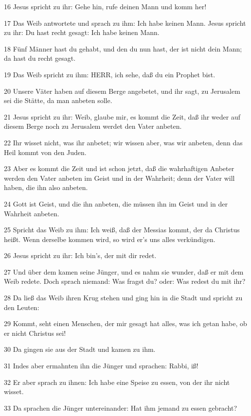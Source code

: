\par 16 Jesus spricht zu ihr: Gehe hin, rufe deinen Mann und komm her!
\par 17 Das Weib antwortete und sprach zu ihm: Ich habe keinen Mann. Jesus spricht zu ihr: Du hast recht gesagt: Ich habe keinen Mann.
\par 18 Fünf Männer hast du gehabt, und den du nun hast, der ist nicht dein Mann; da hast du recht gesagt.
\par 19 Das Weib spricht zu ihm: HERR, ich sehe, daß du ein Prophet bist.
\par 20 Unsere Väter haben auf diesem Berge angebetet, und ihr sagt, zu Jerusalem sei die Stätte, da man anbeten solle.
\par 21 Jesus spricht zu ihr: Weib, glaube mir, es kommt die Zeit, daß ihr weder auf diesem Berge noch zu Jerusalem werdet den Vater anbeten.
\par 22 Ihr wisset nicht, was ihr anbetet; wir wissen aber, was wir anbeten, denn das Heil kommt von den Juden.
\par 23 Aber es kommt die Zeit und ist schon jetzt, daß die wahrhaftigen Anbeter werden den Vater anbeten im Geist und in der Wahrheit; denn der Vater will haben, die ihn also anbeten.
\par 24 Gott ist Geist, und die ihn anbeten, die müssen ihn im Geist und in der Wahrheit anbeten.
\par 25 Spricht das Weib zu ihm: Ich weiß, daß der Messias kommt, der da Christus heißt. Wenn derselbe kommen wird, so wird er's uns alles verkündigen.
\par 26 Jesus spricht zu ihr: Ich bin's, der mit dir redet.
\par 27 Und über dem kamen seine Jünger, und es nahm sie wunder, daß er mit dem Weib redete. Doch sprach niemand: Was fragst du? oder: Was redest du mit ihr?
\par 28 Da ließ das Weib ihren Krug stehen und ging hin in die Stadt und spricht zu den Leuten:
\par 29 Kommt, seht einen Menschen, der mir gesagt hat alles, was ich getan habe, ob er nicht Christus sei!
\par 30 Da gingen sie aus der Stadt und kamen zu ihm.
\par 31 Indes aber ermahnten ihn die Jünger und sprachen: Rabbi, iß!
\par 32 Er aber sprach zu ihnen: Ich habe eine Speise zu essen, von der ihr nicht wisset.
\par 33 Da sprachen die Jünger untereinander: Hat ihm jemand zu essen gebracht?
